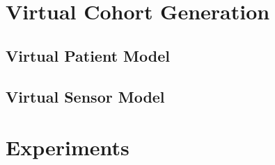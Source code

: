 \documentclass[final]{sig-alternate}
\begin{document}
\section{Virtual Cohort Generation}
\subsection{Virtual Patient Model}
\subsection{Virtual Sensor Model}

\section{Experiments}



%
\end{document}
